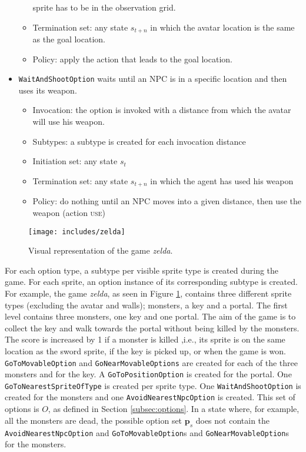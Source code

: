 \begin{itemize}
\begin{itemize}
				sprite has to be in the observation grid.
			\item Termination set: any state $s_{t+n}$ in which the avatar
				location is the same as the goal location.
			\item Policy: apply the action that leads to the goal
				location.
		\end{itemize}
	\item \texttt{WaitAndShootOption} waits until an NPC is in a specific location and
		then uses its weapon.
		\begin{itemize}
			\item Invocation: the option is invoked with a distance from which
				the avatar will use his weapon.
			\item Subtypes: a subtype is created for each invocation distance
			\item Initiation set: any state $s_t$
			\item Termination set: any state $s_{t+n}$ in which the agent has
				used his weapon
			\item Policy: do nothing until an NPC moves into a given distance,
				then use the weapon (action \textsc{use})
		\end{itemize}
\end{itemize}

\begin{figure}
	\centering
	\texttt{[image: includes/zelda]}
	\caption{Visual representation of the game \textit{zelda}.}
	\label{fig:zelda}
\end{figure}

For each option type, a subtype per visible sprite type is created during the
game. For each sprite, an option instance of its corresponding subtype is
created. For example, the game \textit{zelda}, as seen in Figure \ref{fig:zelda},
contains three different sprite types (excluding the avatar and walls);
monsters, a key and a portal. The first level contains three monsters, one key
and one portal. The aim of the game is to collect the key and walk towards
the portal without being killed by the monsters. The score is increased by 1 if
a monster is killed ,i.e., its sprite is on the same location as the sword
sprite, if the key is picked up, or when the game is won.
\texttt{GoToMovableOption} and \texttt{GoNearMovableOptions} are created for
each of the three monsters and for the key. A \texttt{GoToPositionOption} is
created for the portal.  One \texttt{GoToNearestSpriteOfType} is created per
sprite type. One \texttt{WaitAndShootOption} is created for the monsters and
one \texttt{AvoidNearestNpc\-Option} is created. This set of options is $O$, as
defined in Section \ref{subsec:options}. In a state where, for example, all the
monsters are dead, the possible option set $\mathbf{p}_s$ does not contain the
\texttt{AvoidNearestNpcOption} and \texttt{GoToMovableOption}s and
\texttt{GoNearMovableOption}s for the monsters.

